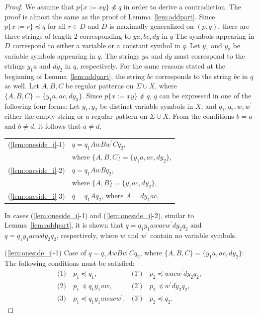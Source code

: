\begin{proof}
We assume that $p \{ x := xy \} \not \preceq q$ in order to derive a contradiction.
The proof is almost the same as the proof of Lemma~\ref{lem:addpart}.
Since $p \{ x := r \} \preceq q$ for all $r \in D$ and $D$ is maximally generalized on $(p,q)$, there are three strings of length $2$ corresponding to $ya, bc, dy$ in $q$
The symbols appearing in $D$ correspond to either a variable or a constant symbol in $q$.
Let $y_{1}$ and $y_{2}$ be variable symbols appearing in $q$.
The strings $ya$ and $dy$ must correspond to the strings $y_{1}a$ and $dy_{2}$ in $q$, respectively.
For the same reasons stated at the beginning of Lemma~\ref{lem:addpart}, the string $bc$ corresponds to the string $bc$ in $q$ as well.
Let $A,B,C$ be regular patterns on $\Sigma \cup X$, where $\{ A,B,C \} = \{ y_{1}a,ac,dy_{3} \}$.
Since $p \{ x := xy \} \not \preceq q$, $q$ can be expressed in one of the following four forms:
Let $y_{1}, y_{2}$ be distinct variable symbols in $X$, and $q_{1}, q_{2}, w, w^{\prime}$ either the empty string or a regular pattern on $\Sigma\cup X$.
From the conditions $b = a$ and $b \not= d$, it follows that $a \not= d$.

\smallskip

\begin{tabular}{ll}
(\ref{lem:oneside_i}-1) & $q=q_{1}AwBw^{\prime}Cq_{2}$,\\
& where $\{ A,B,C \} = \{ y_{1}a,ac,dy_{2} \}$,\\
(\ref{lem:oneside_i}-2) & $q=q_{1}AwBq_{2}$,\\
& where $\{ A,B \} = \{ y_{1}ac,dy_{2} \}$,\\
(\ref{lem:oneside_i}-3) & $q=q_{1}Aq_{2}$, where $A = dy_{1}ac$.
\end{tabular}

\smallskip

In cases (\ref{lem:oneside_i}-1) and (\ref{lem:oneside_i}-2), similar to Lemma~\ref{lem:addpart}, it is shown that $q=q_{1}y_{1}awacw^{\prime}dy_{2}q_{2}$ and $q=q_{1}y_{1}acwdy_{2}q_{2}$, respectively, where $w$ and $w^{\prime}$ contain no variable symbols.

\smallskip

\noindent
(\ref{lem:oneside_i}-1) Case of $q=q_{1}AwBw^{\prime}Cq_{2}$, where $\{ A,B,C \} = \{ y_{1}a,ac,dy_{2} \}$:
The following conditions must be satisfied:
\begin{align*}
  \textrm{(1)}~& p_{1} \preceq q_{1}, & \textrm{(1')}~& p_{2} \preceq wacw^{\prime}dy_{2}q_{2}, \\
  \textrm{(2)}~& p_{1} \preceq q_{1}y_{1}aw, & \textrm{(2')}~& p_{2} \preceq w^{\prime}dy_{2}q_{2}, \\
  \textrm{(3)}~& p_{1} \preceq q_{1}y_{1}awacw^{\prime}, & \textrm{(3')}~& p_{2} \preceq q_{2}.
\end{align*}


\end{proof}
